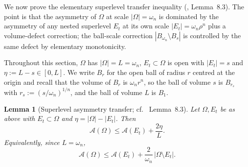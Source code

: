 \documentclass[11pt]{article}
\newtheorem{lemma}[theorem]{Lemma}
\theoremstyle{definition}
\newcommand{\Fr}{\mathcal{A}}
\newcommand{\Om}{\Omega}
\begin{document}
We now prove the elementary superlevel transfer inequality
(\cite{LevelSetIdentity}, Lemma~8.3). The point is that the
asymmetry of $\Om$ at scale $|\Om|=\omega_n$ is dominated by the
asymmetry of any nested superlevel $E_t$ at its own scale
$|E_t|=\omega_n\rho^n$ plus a volume-defect correction; the
ball-scale correction $|B_{\omega_n}\setminus B_s|$ is controlled by
the same defect by elementary monotonicity.

Throughout this section, $\Om$ has $|\Om|=L=\omega_n$, $E_t\subset\Om$
is open with $|E_t|=s$ and $\eta:=L-s\in[0,L]$. We write $B_r$ for the
open ball of radius $r$ centred at the origin and recall that the
volume of $B_r$ is $\omega_n r^n$, so the ball of volume $s$ is
$B_{r_s}$ with $r_s:=(s/\omega_n)^{1/n}$, and the ball of volume $L$ is
$B_1$.

\begin{lemma}[Superlevel asymmetry transfer; cf.\
\cite{LevelSetIdentity} Lemma~8.3]\label{lem:8.3}
Let $\Om,E_t$ be as above with $E_t\subset\Om$ and $\eta=|\Om|-|E_t|$.
Then
\begin{equation}\label{eq:8.3}
\Fr(\Om)\le \Fr(E_t)+\frac{2\eta}{L}.
\end{equation}
Equivalently, since $L=\omega_n$,
\begin{equation}\label{eq:8.3-omega}
\Fr(\Om)\le \Fr(E_t)+\frac{2}{\omega_n}\,|\Om\setminus E_t|.
\end{equation}
\end{lemma}
\end{document}
